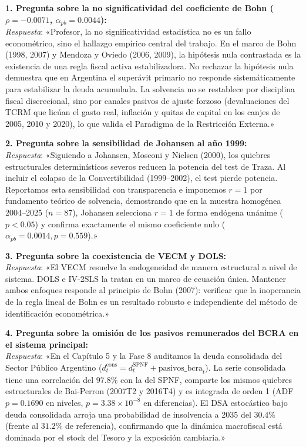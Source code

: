\documentclass[11pt,a4paper]{article}
\begin{document}
\begin{mdframed}[style=infobox]
\textbf{1. Pregunta sobre la no significatividad del coeficiente de Bohn ($\rho = -0.0071$, $\alpha_{pb} = 0.0044$):}\\
\textit{Respuesta}: «Profesor, la no significatividad estadística no es un fallo econométrico, sino el hallazgo empírico central del trabajo. En el marco de Bohn (1998, 2007) y Mendoza y Oviedo (2006, 2009), la hipótesis nula contrastada es la existencia de una regla fiscal activa estabilizadora. No rechazar la hipótesis nula demuestra que en Argentina el superávit primario no responde sistemáticamente para estabilizar la deuda acumulada. La solvencia no se restablece por disciplina fiscal discrecional, sino por canales pasivos de ajuste forzoso (devaluaciones del TCRM que licúan el gasto real, inflación y quitas de capital en los canjes de 2005, 2010 y 2020), lo que valida el Paradigma de la Restricción Externa.»

\vspace{0.2cm}
\textbf{2. Pregunta sobre la sensibilidad de Johansen al año 1999:}\\
\textit{Respuesta}: «Siguiendo a Johansen, Mosconi y Nielsen (2000), los quiebres estructurales determinísticos severos reducen la potencia del test de Traza. Al incluir el colapso de la Convertibilidad (1999--2002), el test pierde potencia. Reportamos esta sensibilidad con transparencia e imponemos $r=1$ por fundamento teórico de solvencia, demostrando que en la muestra homogénea 2004--2025 ($n=87$), Johansen selecciona $r=1$ de forma endógena unánime ($p < 0.05$) y confirma exactamente el mismo coeficiente nulo ($\alpha_{pb} = 0.0014, p = 0.559$).»

\vspace{0.2cm}
\textbf{3. Pregunta sobre la coexistencia de VECM y DOLS:}\\
\textit{Respuesta}: «El VECM resuelve la endogeneidad de manera estructural a nivel de sistema. DOLS e IV-2SLS la tratan en un marco de ecuación única. Mantener ambos enfoques responde al principio de Bohn (2007): verificar que la inoperancia de la regla lineal de Bohn es un resultado robusto e independiente del método de identificación econométrica.»

\vspace{0.2cm}
\textbf{4. Pregunta sobre la omisión de los pasivos remunerados del BCRA en el sistema principal:}\\
\textit{Respuesta}: «En el Capítulo 5 y la Fase 8 auditamos la deuda consolidada del Sector Público Argentino ($d^{\text{cons}}_t = d^{\text{SPNF}}_t + \text{pasivos\_bcra}_t$). La serie consolidada tiene una correlación del $97.8\%$ con la del SPNF, comparte los mismos quiebres estructurales de Bai-Perron (2007T2 y 2016T4) y es integrada de orden 1 (ADF $p=0.1690$ en niveles, $p=3.38 \times 10^{-8}$ en diferencias). El DSA estocástico bajo deuda consolidada arroja una probabilidad de insolvencia a 2035 del $30.4\%$ (frente al $31.2\%$ de referencia), confirmando que la dinámica macrofiscal está dominada por el stock del Tesoro y la exposición cambiaria.»


\end{mdframed}
\end{document}
